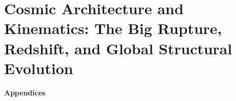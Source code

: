 \documentclass[11pt, letterpaper]{report}
\begin{document}
\part{Cosmic Architecture and Kinematics: The Big Rupture, Redshift, and Global Structural Evolution}
\label{part:three}














\cleardoublepage

\cleardoublepage
{} %
\vspace*{\fill}
\begin{center}
    \Huge \textbf{Appendices}
\end{center}
\vspace*{\fill}
\clearpage

\appendix
\renewcommand{\thechapter}{\AlphAlph{\value{chapter}}}
\end{document}
